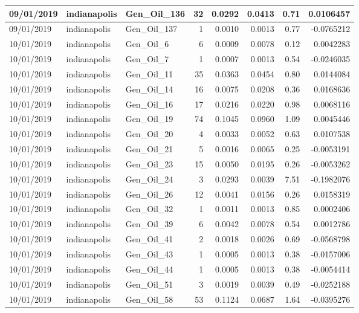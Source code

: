 \documentclass[
  letterpaper,
  DIV=11,
  numbers=noendperiod]{scrartcl}
\begin{document}
\begin{tabular}{l|l|l|r|r|r|r|r}
\hline
09/01/2019 & indianapolis & Gen\_Oil\_136 & 32 & 0.0292 & 0.0413 & 0.71 & 0.0106457\\
\hline
09/01/2019 & indianapolis & Gen\_Oil\_137 & 1 & 0.0010 & 0.0013 & 0.77 & -0.0765212\\
\hline
10/01/2019 & indianapolis & Gen\_Oil\_6 & 6 & 0.0009 & 0.0078 & 0.12 & 0.0042283\\
\hline
10/01/2019 & indianapolis & Gen\_Oil\_7 & 1 & 0.0007 & 0.0013 & 0.54 & -0.0246035\\
\hline
10/01/2019 & indianapolis & Gen\_Oil\_11 & 35 & 0.0363 & 0.0454 & 0.80 & 0.0144084\\
\hline
10/01/2019 & indianapolis & Gen\_Oil\_14 & 16 & 0.0075 & 0.0208 & 0.36 & 0.0168636\\
\hline
10/01/2019 & indianapolis & Gen\_Oil\_16 & 17 & 0.0216 & 0.0220 & 0.98 & 0.0068116\\
\hline
10/01/2019 & indianapolis & Gen\_Oil\_19 & 74 & 0.1045 & 0.0960 & 1.09 & 0.0045446\\
\hline
10/01/2019 & indianapolis & Gen\_Oil\_20 & 4 & 0.0033 & 0.0052 & 0.63 & 0.0107538\\
\hline
10/01/2019 & indianapolis & Gen\_Oil\_21 & 5 & 0.0016 & 0.0065 & 0.25 & -0.0053191\\
\hline
10/01/2019 & indianapolis & Gen\_Oil\_23 & 15 & 0.0050 & 0.0195 & 0.26 & -0.0053262\\
\hline
10/01/2019 & indianapolis & Gen\_Oil\_24 & 3 & 0.0293 & 0.0039 & 7.51 & -0.1982076\\
\hline
10/01/2019 & indianapolis & Gen\_Oil\_26 & 12 & 0.0041 & 0.0156 & 0.26 & 0.0158319\\
\hline
10/01/2019 & indianapolis & Gen\_Oil\_32 & 1 & 0.0011 & 0.0013 & 0.85 & 0.0002406\\
\hline
10/01/2019 & indianapolis & Gen\_Oil\_39 & 6 & 0.0042 & 0.0078 & 0.54 & 0.0012786\\
\hline
10/01/2019 & indianapolis & Gen\_Oil\_41 & 2 & 0.0018 & 0.0026 & 0.69 & -0.0568798\\
\hline
10/01/2019 & indianapolis & Gen\_Oil\_43 & 1 & 0.0005 & 0.0013 & 0.38 & -0.0157006\\
\hline
10/01/2019 & indianapolis & Gen\_Oil\_44 & 1 & 0.0005 & 0.0013 & 0.38 & -0.0054414\\
\hline
10/01/2019 & indianapolis & Gen\_Oil\_51 & 3 & 0.0019 & 0.0039 & 0.49 & -0.0252188\\
\hline
10/01/2019 & indianapolis & Gen\_Oil\_58 & 53 & 0.1124 & 0.0687 & 1.64 & -0.0395276\\

\end{tabular}
\end{document}
